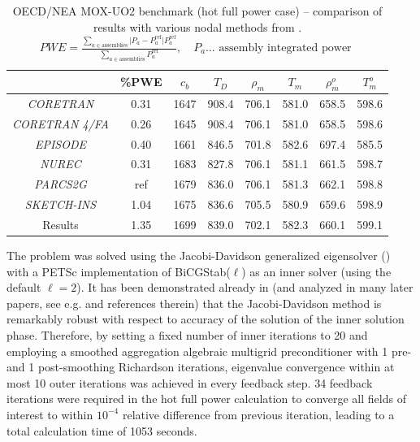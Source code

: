 \begin{table}[b]
\begin{tabular}{|c|c|c|c|c|c|c|c|}
\hline  & \%PWE & $c_b$ & $T_D$ & $\rho_m$ & $T_m$ & $\rho_m^o$ & $T_m^o$ \\ 
\hline \textsl{CORETRAN} & 0.31 & 1647 & 908.4 & 706.1 & 581.0 & 658.5 & 598.6 \\ 
\hline \textsl{CORETRAN 4/FA} & 0.26 & 1645 & 908.4 & 706.1 & 581.0 & 658.5 & 598.6 \\ 
\hline \textsl{EPISODE} & 0.40 & 1661 & 846.5 & 701.8 & 582.6 & 697.4 & 585.5 \\ 
\hline \textsl{NUREC} & 0.31 & 1683 & 827.8 & 706.1 & 581.1 & 661.5 & 598.7 \\ 
\hline \textsl{PARCS2G} & ref & 1679 & 836.0 & 706.1 & 581.3 & 662.1 & 598.8 \\ 
\hline \textsl{SKETCH-INS} & 1.04 & 1675 & 836.6 & 705.5 & 580.9 & 659.6 & 598.9 \\ 
\hline\hline Results & 1.35 & 1699 & 839.0 & 702.1 & 582.3 & 660.1 & 599.1 \\ 
\hline 
\end{tabular}
\caption[OECD/NEA MOX-UO2 benchmark -- comparison with various nodal methods]{
OECD/NEA MOX-UO2 benchmark (hot full power case) -- comparison of results with various nodal methods from
\cite{mox-bench}.\\
$
 	PWE = \frac{\sum_{a\in\text{assemblies}}\lvert P_{a} - P^{\text{ref}}_{a} \rvert P^{\text{ref}}_{a}}
 			   {\sum_{a\in\text{assemblies}} P^{\text{ref}}_{a}},\quad P_a\ldots\mbox{ assembly integrated power } 
$
}
\end{table} 

The problem was solved using the Jacobi-Davidson generalized eigensolver (\cite{slepcjd}) with a PETSc implementation of
BiCGStab($\ell$) \cite{Sleijpen1} as an inner solver (using the default $\ell = 2$). It has been demonstrated already in \cite{Sleijpen1} (and analyzed in many later papers, see
e.g. \cite{Notay} and references therein) that the Jacobi-Davidson method is remarkably robust with respect to accuracy
of the solution of the inner solution phase. Therefore, by setting a fixed number of inner iterations to 20 and
employing a smoothed aggregation algebraic multigrid preconditioner with 1 pre- and 1 post-smoothing Richardson
iterations, eigenvalue convergence within at most 10 outer iterations was achieved in every feedback step. 34 feedback
iterations were required in the hot full power calculation to converge all fields of interest to within $10^{-4}$
relative difference from previous iteration, leading to a total calculation time of 1053 seconds. 

